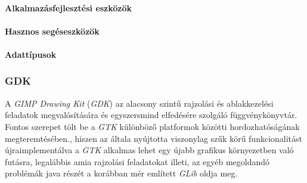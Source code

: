 \paragraph{Alkalmazásfejlesztési eszközök}
\paragraph{Hasznos segéseszközök}
\paragraph{Adattípusok}


\subsubsection{GDK}

A \textit{GIMP Drawing Kit} (\textit{GDK}) az alacsony szintű rajzolási és ablakkezelési feladatok megvalósítására és egyszersmind elfedésére szolgáló függvénykönyvtár. Fontos szerepet tölt be a \textit{GTK} különböző platformok közötti hordozhatóságának megteremtésében., hiszen az általa nyújtotta viszonylag szűk körű funkcionalitást újraimplementálva a \textit{GTK} alkalmas lehet egy újabb grafikus környezetben való futásra, legalábbis amia rajzolási feladatokat illeti, az egyéb megoldandó problémák java részét a korábban mér említett \textit{GLib} oldja meg.

